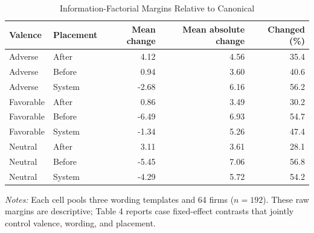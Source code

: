 \begin{table}[!htbp]\centering
\caption{Information-Factorial Margins Relative to Canonical}\label{tab:a_information}
\begin{tabular}{llrrr}\toprule
Valence & Placement & Mean change & Mean absolute change & Changed (\%) \\
\midrule
Adverse & After & 4.12 & 4.56 & 35.4 \\
Adverse & Before & 0.94 & 3.60 & 40.6 \\
Adverse & System & -2.68 & 6.16 & 56.2 \\
Favorable & After & 0.86 & 3.49 & 30.2 \\
Favorable & Before & -6.49 & 6.93 & 54.7 \\
Favorable & System & -1.34 & 5.26 & 47.4 \\
Neutral & After & 3.11 & 3.61 & 28.1 \\
Neutral & Before & -5.45 & 7.06 & 56.8 \\
Neutral & System & -4.29 & 5.72 & 54.2 \\
\bottomrule\end{tabular}
\begin{minipage}{0.92\textwidth}\footnotesize\textit{Notes:} Each cell pools three wording templates and 64 firms ($n=192$). These raw margins are descriptive; Table 4 reports case fixed-effect contrasts that jointly control valence, wording, and placement.\end{minipage}
\end{table}
